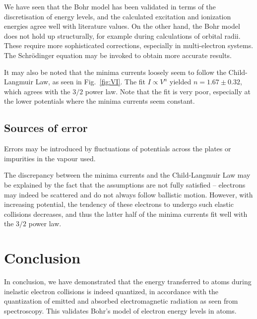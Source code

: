 \documentclass[11pt]{article}
\begin{document}
        We have seen that the Bohr model has been validated in terms of the discretisation of energy levels, and the 
        calculated excitation and ionization energies agree well with literature values. On the other hand, the Bohr model
        does not hold up structurally, for example during calculations of orbital radii. These require more sophisticated
        corrections, especially in multi-electron systems. The Schr\"odinger equation may be invoked to obtain more accurate results.

        It may also be noted that the minima currents loosely seem to follow the Child-Langmuir Law, as seen in Fig.~\ref{fig:VI}.
        The fit $I \propto V^n$ yielded $n = 1.67 \pm 0.32$, which agrees with the $3 /2$ power law.
        Note that the fit is very poor, especially at the lower potentials where the minima currents seem constant.

        \subsection{Sources of error}

        Errors may be introduced by fluctuations of potentials across the plates or impurities in the vapour used.

        The discrepancy between the minima currents and the Child-Langmuir Law may be explained by the fact that the assumptions
        are not fully satisfied -- electrons may indeed be scattered and do not always follow ballistic motion. However,
        with increasing potential, the tendency of these electrons to undergo such elastic collisions decreases, and
        thus the latter half of the minima currents fit well with the $3 /2$ power law.
        
        \section{Conclusion}
        In conclusion, we have demonstrated that the energy transferred to atoms during inelastic electron collisions is indeed
        quantized, in accordance with the quantization of emitted and absorbed electromagnetic radiation as seen from spectroscopy.
        This validates Bohr's model of electron energy levels in atoms.

\end{document}
